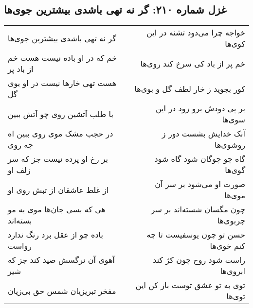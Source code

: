 \begin{center}
\section*{غزل شماره ۲۱۰: گر نه تهی باشدی بیشترین جوی‌ها}
\label{sec:0210}
\begin{longtable}{l p{0.5cm} r}
گر نه تهی باشدی بیشترین جوی‌ها
&&
خواجه چرا می‌دود تشنه در این کوی‌ها
\\
خم که در او باده نیست هست خم از باد پر
&&
خم پر از باد کی سرخ کند روی‌ها
\\
هست تهی خارها نیست در او بوی گل
&&
کور بجوید ز خار لطف گل و بوی‌ها
\\
با طلب آتشین روی چو آتش ببین
&&
بر پی دودش برو زود در این سوی‌ها
\\
در حجب مشک موی روی ببین اه چه روی
&&
آنک خدایش بشست دور ز روشوی‌ها
\\
بر رخ او پرده نیست جز که سر زلف او
&&
گاه چو چوگان شود گاه شود گوی‌ها
\\
از غلط عاشقان از تبش روی او
&&
صورت او می‌شود بر سر آن موی‌ها
\\
هی که بسی جان‌ها موی به مو بسته‌اند
&&
چون مگسان شسته‌اند بر سر چربوی‌ها
\\
باده چو از عقل برد رنگ ندارد رواست
&&
حسن تو چون یوسفیست تا چه کنم خوی‌ها
\\
آهوی آن نرگسش صید کند جز که شیر
&&
راست شود روح چون کژ کند ابروی‌ها
\\
مفخر تبریزیان شمس حق بی‌زیان
&&
توی به تو عشق توست باز کن این توی‌ها
\\
\end{longtable}
\end{center}
